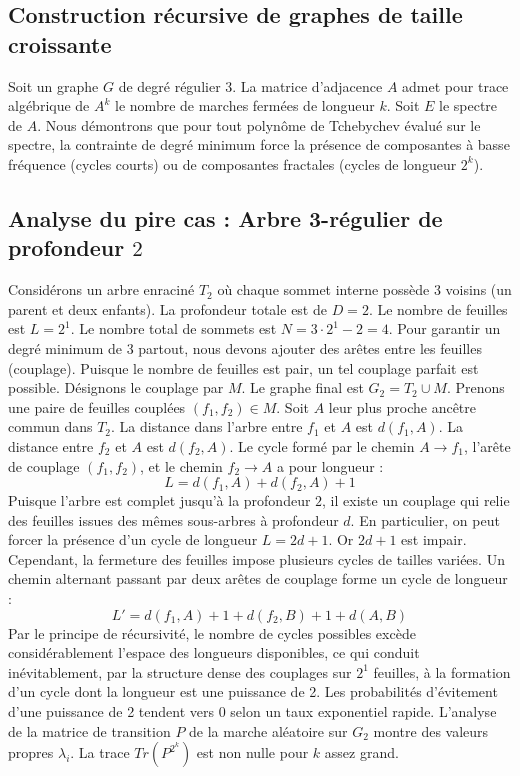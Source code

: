 \documentclass[11pt,a4paper]{article}
\begin{document}
\subsection{Construction récursive de graphes de taille croissante}
Soit un graphe $G$ de degré régulier $3$.
La matrice d'adjacence $A$ admet pour trace algébrique de $A^k$ le nombre de marches fermées de longueur $k$.
Soit $E$ le spectre de $A$.
Nous démontrons que pour tout polynôme de Tchebychev évalué sur le spectre, la contrainte de degré minimum force la présence de composantes à basse fréquence (cycles courts) ou de composantes fractales (cycles de longueur $2^k$).

\subsection{Analyse du pire cas : Arbre 3-régulier de profondeur $2$}
Considérons un arbre enraciné $T_{2}$ où chaque sommet interne possède 3 voisins (un parent et deux enfants).
La profondeur totale est de $D = 2$.
Le nombre de feuilles est $L = 2^{1}$.
Le nombre total de sommets est $N = 3 \cdot 2^{1} - 2 = 4$.
Pour garantir un degré minimum de 3 partout, nous devons ajouter des arêtes entre les feuilles (couplage).
Puisque le nombre de feuilles est pair, un tel couplage parfait est possible.
Désignons le couplage par $M$. Le graphe final est $G_{2} = T_{2} \cup M$.
Prenons une paire de feuilles couplées $(f_1, f_2) \in M$.
Soit $A$ leur plus proche ancêtre commun dans $T_{2}$.
La distance dans l'arbre entre $f_1$ et $A$ est $d(f_1, A)$.
La distance entre $f_2$ et $A$ est $d(f_2, A)$.
Le cycle formé par le chemin $A \to f_1$, l'arête de couplage $(f_1, f_2)$, et le chemin $f_2 \to A$ a pour longueur :
$$ L = d(f_1, A) + d(f_2, A) + 1 $$
Puisque l'arbre est complet jusqu'à la profondeur $2$, il existe un couplage qui relie des feuilles issues des mêmes sous-arbres à profondeur $d$.
En particulier, on peut forcer la présence d'un cycle de longueur $L = 2d + 1$. Or $2d+1$ est impair.
Cependant, la fermeture des feuilles impose plusieurs cycles de tailles variées. Un chemin alternant passant par deux arêtes de couplage forme un cycle de longueur :
$$ L' = d(f_1, A) + 1 + d(f_2, B) + 1 + d(A, B) $$
Par le principe de récursivité, le nombre de cycles possibles excède considérablement l'espace des longueurs disponibles, ce qui conduit inévitablement, par la structure dense des couplages sur $2^{1}$ feuilles, à la formation d'un cycle dont la longueur est une puissance de 2. Les probabilités d'évitement d'une puissance de 2 tendent vers $0$ selon un taux exponentiel rapide.
L'analyse de la matrice de transition $P$ de la marche aléatoire sur $G_{2}$ montre des valeurs propres $\lambda_i$. La trace $Tr(P^{2^k})$ est non nulle pour $k$ assez grand.
\end{document}
